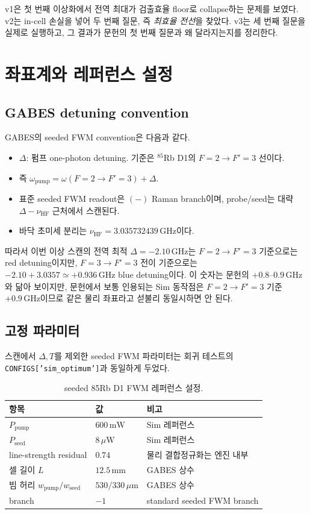 \documentclass[11pt,a4paper]{article}
\newcommand{\GHz}{\,\mathrm{GHz}}
\begin{document}
v1은 첫 번째 이상화에서 전역 최대가 검출효율 floor로 collapse하는 문제를 보였다. v2는
in-cell 손실을 넣어 두 번째 질문, 즉 \emph{최효율 전선}을 찾았다. v3는 세 번째 질문을 실제로
실행하고, 그 결과가 문헌의 첫 번째 질문과 왜 달라지는지를 정리한다.

\section{좌표계와 레퍼런스 설정}

\subsection{GABES detuning convention}
GABES의 seeded FWM convention은 다음과 같다.
\begin{itemize}[nosep]
\item $\Delta$: 펌프 one-photon detuning. 기준은 $^{85}$Rb D1의
      $F=2\to F'=3$ 선이다.
\item 즉 $\omega_{\mathrm{pump}}=\omega(F=2\to F'=3)+\Delta$.
\item 표준 seeded FWM readout은 $(-)$ Raman branch이며, probe/seed는 대략
      $\Delta-\nu_{\mathrm{HF}}$ 근처에서 스캔된다.
\item 바닥 초미세 분리는 $\nu_{\mathrm{HF}}=3.035732439\GHz$이다.
\end{itemize}

따라서 이번 이상 스캔의 전역 최적 $\Delta=-2.10\GHz$는
$F=2\to F'=3$ 기준으로는 red detuning이지만, $F=3\to F'=3$ 전이 기준으로는
$-2.10+3.0357\simeq+0.936\GHz$ blue detuning이다. 이 숫자는 문헌의
$+0.8\text{--}0.9\GHz$와 닮아 보이지만, 문헌에서 보통 인용되는 Sim 동작점은
$F=2\to F'=3$ 기준 $+0.9\GHz$이므로 같은 물리 좌표라고 섣불리 동일시하면 안 된다.

\subsection{고정 파라미터}
스캔에서 $\Delta,T$를 제외한 seeded FWM 파라미터는 회귀 테스트의
\texttt{CONFIGS['sim\_optimum']}과 동일하게 두었다.

\begin{table}[h]
\centering
\caption{seeded 85Rb D1 FWM 레퍼런스 설정.}
\label{tab:refparams}
\begin{tabular}{lll}
\toprule
항목 & 값 & 비고\\
\midrule
$P_{\mathrm{pump}}$ & $600\,\mathrm{mW}$ & Sim 레퍼런스\\
$P_{\mathrm{seed}}$ & $8\,\mu\mathrm{W}$ & Sim 레퍼런스\\
line-strength residual & $0.74$ & 물리 결합정규화는 엔진 내부\\
셀 길이 $L$ & $12.5\,\mathrm{mm}$ & GABES 상수\\
빔 허리 $w_{\mathrm{pump}}/w_{\mathrm{seed}}$ & $530/330\,\mu\mathrm{m}$ & GABES 상수\\
branch & $-1$ & standard seeded FWM branch\\
\bottomrule
\end{tabular}
\end{table}
\end{document}
